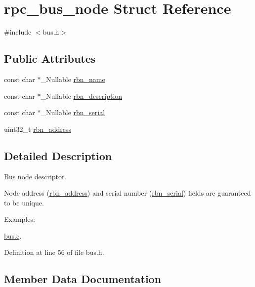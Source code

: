 \hypertarget{structrpc__bus__node}{}\section{rpc\+\_\+bus\+\_\+node Struct Reference}
\label{structrpc__bus__node}


{\ttfamily \#include $<$bus.\+h$>$}

\subsection*{Public Attributes}
\begin{DoxyCompactItemize}
\item 
const char $\ast$\+\_\+\+Nullable \hyperlink{structrpc__bus__node_a9afbf9a155ae01c1c47dc210a8334022}{rbn\+\_\+name}
\item 
const char $\ast$\+\_\+\+Nullable \hyperlink{structrpc__bus__node_af5d23beee7c50520e7235f0c922fafb1}{rbn\+\_\+description}
\item 
const char $\ast$\+\_\+\+Nullable \hyperlink{structrpc__bus__node_a885b358a61a0b459d86d7c534be6ef0f}{rbn\+\_\+serial}
\item 
uint32\+\_\+t \hyperlink{structrpc__bus__node_a624e2a0be665938924ab2f815afb669e}{rbn\+\_\+address}
\end{DoxyCompactItemize}


\subsection{Detailed Description}
Bus node descriptor.

Node address (\hyperlink{structrpc__bus__node_a624e2a0be665938924ab2f815afb669e}{rbn\+\_\+address}) and serial number (\hyperlink{structrpc__bus__node_a885b358a61a0b459d86d7c534be6ef0f}{rbn\+\_\+serial}) fields are guaranteed to be unique. \begin{Desc}
\item[Examples\+: ]\par
\hyperlink{bus_8c-example}{bus.\+c}.\end{Desc}


Definition at line 56 of file bus.\+h.



\subsection{Member Data Documentation}
\mbox{\label{structrpc__bus__node_a624e2a0be665938924ab2f815afb669e}} 
